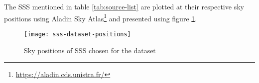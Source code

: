 		The SSS mentioned in table \ref{tab:source-list} are plotted at their respective sky positions using Aladin Sky Atlas\footnote{\url{https://aladin.cds.unistra.fr/}} and presented using figure \ref{fig:sss-sky-position}.

		\begin{figure}[!htb]
			\centering
			\texttt{[image: sss-dataset-positions]}
			\caption{Sky positions of SSS chosen for the dataset}
			\label{fig:sss-sky-position}
		\end{figure}

		
